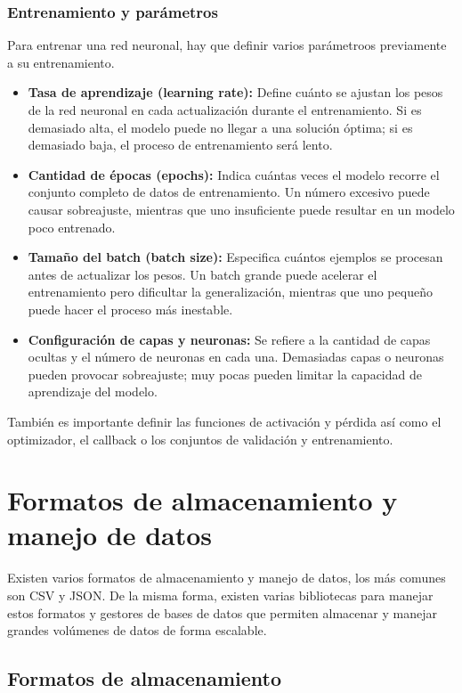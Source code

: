 \subsubsection{Entrenamiento y parámetros}

Para entrenar una red neuronal, hay que definir varios parámetroos previamente a su entrenamiento.
\begin{itemize}
	\item \textbf{Tasa de aprendizaje (learning rate):} Define cuánto se ajustan los pesos de la red neuronal en cada actualización durante el entrenamiento. Si es demasiado alta, el modelo puede no llegar a una solución óptima; si es demasiado baja, el proceso de entrenamiento será lento.
	\item \textbf{Cantidad de épocas (epochs):} Indica cuántas veces el modelo recorre el conjunto completo de datos de entrenamiento. Un número excesivo puede causar sobreajuste, mientras que uno insuficiente puede resultar en un modelo poco entrenado.
	\item \textbf{Tamaño del batch (batch size):} Especifica cuántos ejemplos se procesan antes de actualizar los pesos. Un batch grande puede acelerar el entrenamiento pero dificultar la generalización, mientras que uno pequeño puede hacer el proceso más inestable.
	\item \textbf{Configuración de capas y neuronas:} Se refiere a la cantidad de capas ocultas y el número de neuronas en cada una. Demasiadas capas o neuronas pueden provocar sobreajuste; muy pocas pueden limitar la capacidad de aprendizaje del modelo.
\end{itemize}

También es importante definir las funciones de activación y pérdida así como el optimizador, el callback o los conjuntos de validación y entrenamiento.

\section{Formatos de almacenamiento y manejo de datos}

Existen varios formatos de almacenamiento y manejo de datos, los más comunes son CSV y JSON. 
De la misma forma, existen varias bibliotecas para manejar estos formatos y gestores de bases de datos que permiten almacenar y manejar grandes volúmenes de datos de forma escalable.

\subsection{Formatos de almacenamiento}

